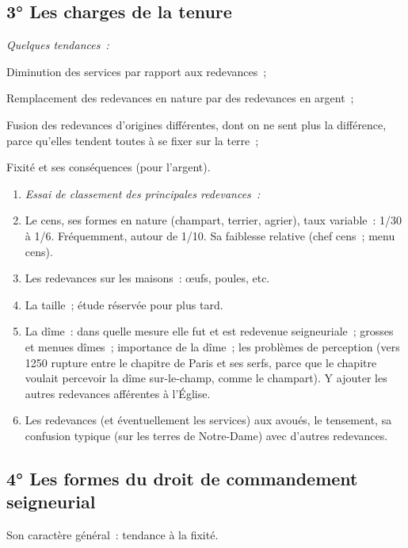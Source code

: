 \documentclass[french,twoside]{book} %
\newlength{\listmod}
\newcommand{\listhead}[1]{\hspace{-1\listmod}\emph{#1}}
\begin{document}
\subsection[{3° Les charges de la tenure}]{3° Les charges de la tenure}

\begin{listalpha}[itemsep=0pt,]
\item[]\listhead{Quelques tendances :}
\item Diminution des services par rapport aux redevances ;
\item Remplacement des redevances en nature par des redevances en argent ;
\item Fusion des redevances d’origines différentes, dont on ne sent plus la différence, parce qu’elles tendent toutes à se fixer sur la terre ;
\item Fixité et ses conséquences (pour l’argent).
\end{listalpha}


\begin{enumerate}[itemsep=0pt,]
\item[]\listhead{Essai de classement des principales redevances :}
\item Le cens, ses formes en nature (champart, terrier, agrier), taux variable : 1/30 à 1/6. Fréquemment, autour de 1/10. Sa faiblesse relative (chef cens ; menu cens).
\item Les redevances sur les maisons : œufs, poules, etc.
\item La taille ; étude réservée pour plus tard.
\item La dîme : dans quelle mesure elle fut et est redevenue seigneuriale ; grosses et menues dîmes ; importance de la dîme ; les problèmes de perception (vers 1250 rupture entre le chapitre de Paris et ses serfs, parce que le chapitre voulait percevoir la dîme sur-le-champ, comme le champart). Y ajouter les autres redevances afférentes à l’Église.  
\label{p58}
\item Les redevances (et éventuellement les services) aux avoués, le tensement, sa confusion typique (sur les terres de Notre-Dame) avec d’autres redevances.
\end{enumerate}

\subsection[{4° Les formes du droit de commandement seigneurial}]{4° Les formes du droit de commandement seigneurial}
\noindent Son caractère général : tendance à la fixité.\par
\end{document}
